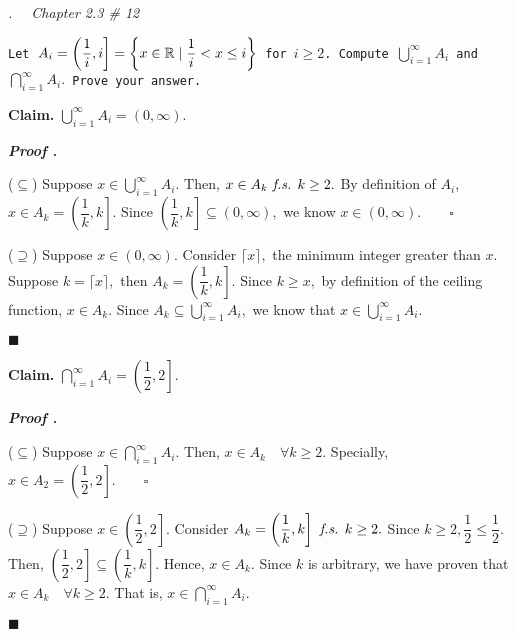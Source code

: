 \documentclass[11pt,letter]{article}
\newcounter{nq}[section]
\newcounter{np}[section]
\newenvironment*{p}{\par\noindent\textbf{\textit{Proof \stepcounter{np}\thenp. }}\par}{\par\hfill $\blacksquare$\par}
\newenvironment*{q}[1]{\noindent\emph{\thesection.\stepcounter{nq}\thenq$\quad $ #1}\par\noindent\texttt}{}
\newenvironment*{clm}{\par\noindent\textbf{Claim. }}{\par}
\def\R{{\mathbb{R}}}
\def\fs{\emph{ f.s. }}
\def\dsst{\displaystyle}
\begin{document}
\begin{framed}\begin{q}
	{Chapter 2.3 \# 12}
	{Let $A_i=\left(\dfrac{1}{i},i\right]=\qty{x\in\R\mid \dfrac{1}{i}<x\leq i}$ for $i\geq2$. Compute $\dsst\bigcup_{i=1}^\infty A_i$ and $\dsst\bigcap_{i=1}^\infty A_i.$ Prove your answer.}
\end{q}\end{framed}
\begin{clm}
	$\dsst\bigcup_{i=1}^\infty A_i=(0,\infty).$
\end{clm}
\begin{p}
	($\subseteq$) Suppose $x\in\dsst\bigcup_{i=1}^\infty A_i.$ Then, $x\in A_k\fs k\geq2.$	By definition of $A_i$, $x\in A_k=\left(\dfrac{1}{k},k\right].$ Since $\left(\dfrac{1}{k},k\right]\subseteq(0,\infty),$ we know $x\in(0,\infty).\qquad\square$\par 
	($\supseteq$) Suppose $x\in(0,\infty).$ Consider $\lceil x\rceil,$ the minimum integer greater than $x$. Suppose $k=\lceil x\rceil,$ then $A_k=\left(\dfrac{1}{k},k\right].$ Since $k\geq x,$ by definition of the ceiling function, $x\in A_k$. Since $A_k\subseteq\dsst\bigcup_{i=1}^\infty A_i,$ we know that $x\in\dsst\bigcup_{i=1}^\infty A_i.$
\end{p}
\begin{clm}
	$\dsst\bigcap_{i=1}^\infty A_i=\left(\dfrac{1}{2},2\right].$
\end{clm}
\begin{p}
	($\subseteq$) Suppose $x\in\dsst\bigcap_{i=1}^\infty A_i.$ Then, $x\in A_k\quad\forall k\geq2.$ Specially, $x\in A_2=\left(\dfrac{1}{2},2\right].\qquad\square$\par 
	($\supseteq$) Suppose $x\in\left(\dfrac{1}{2},2\right].$ Consider $A_k=\left(\dfrac{1}{k},k\right]\fs k\geq2.$ Since $k\geq2,\dfrac{1}{2}\leq\dfrac{1}{2}.$ Then, $\left(\dfrac{1}{2},2\right]\subseteq\left(\dfrac{1}{k},k\right].$ Hence, $x\in A_k.$ Since $k$ is arbitrary, we have proven that $x\in A_k\quad\forall k\geq2.$ That is, $x\in\dsst\bigcap_{i=1}^\infty A_i.$	
\end{p}
\end{document}
